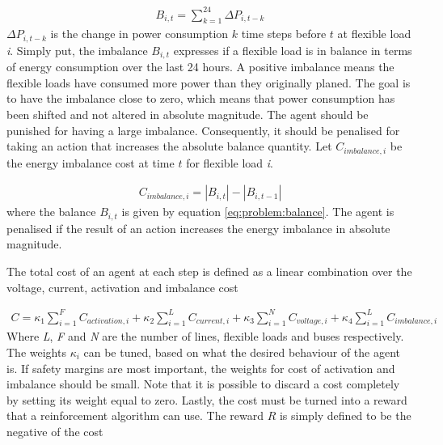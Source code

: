 \documentclass[class=book, crop=false]{standalone}
\begin{document}
\begin{equation}
   \begin{aligned}
   \label{eq:problem:balance}
    B_{i,t} = \sum_{k=1}^{24}\Delta P_{i,t-k}
    \end{aligned} 
\end{equation}
$\Delta P_{i,t-k}$ is the change in power consumption $k$ time steps before $t$ at flexible load \textit{i}. Simply put, the imbalance $B_{i,t}$ expresses if a flexible load is in balance in terms of energy consumption over the last 24 hours. A positive imbalance means the flexible loads have consumed more power than they originally planed. The goal is to have the imbalance close to zero, which means that power consumption has been shifted and not altered in absolute magnitude. The agent should be punished for having a large imbalance. Consequently, it should be penalised for taking an action that increases the absolute balance quantity. Let $C_{imbalance,i}$ be the energy imbalance cost at time $t$ for flexible load \textit{i}.

\begin{equation}
   \begin{aligned}
   \label{eq:problem:balance_cost}
    C_{imbalance,i} = |B_{i,t}| - |B_{i,t-1}|
    \end{aligned} 
\end{equation}
where the balance $B_{i,t}$ is given by equation \eqref{eq:problem:balance}. The agent is penalised if the result of an action increases the energy imbalance in absolute magnitude.  

The total cost of an agent at each step is defined as a linear combination over the voltage, current, activation and imbalance cost 

\begin{equation}
   \begin{aligned}
   \label{eq:problem:total_cost}
    C = 
    \kappa_{1} \sum_{i=1}^{F}C_{activation,i} + 
    \kappa_{2} \sum_{i=1}^{L}C_{current,i} +
    \kappa_{3} \sum_{i=1}^{N}C_{voltage,i} +
    \kappa_{4} \sum_{i=1}^{L}C_{imbalance,i} 
    \end{aligned} 
\end{equation}
Where \textit{L}, \textit{F} and \textit{N} are the number of lines, flexible loads and buses respectively. The weights $\kappa_{i}$ can be tuned, based on what the desired behaviour of the agent is. If safety margins are most important, the weights for cost of activation and imbalance should be small. Note that it is possible to discard a cost completely by setting its weight equal to zero. Lastly, the cost must be turned into a reward that a reinforcement algorithm can use. The reward $R$ is simply defined to be the negative of the cost
\end{document}
